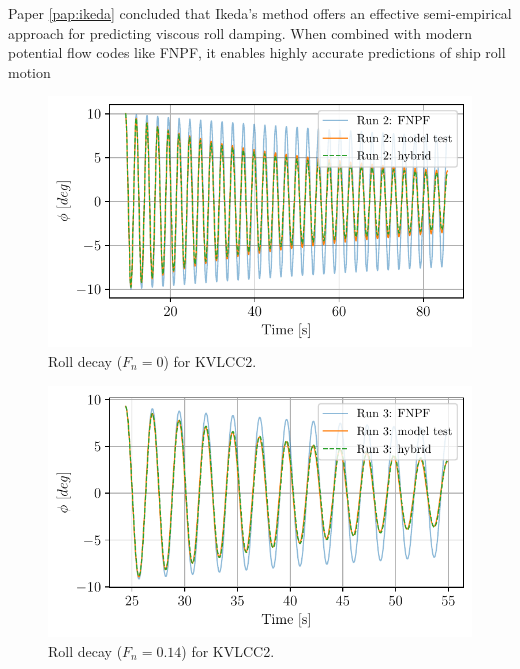 Paper \ref{pap:ikeda} concluded that Ikeda's method offers an effective semi-empirical approach for predicting viscous roll damping. When combined with modern potential flow codes like FNPF, it enables highly accurate predictions of ship roll motion 
\begin{figure}[h]
\center
\includegraphics[width=\textwidth]{figures/hybrid_0_time.pdf}
\caption{Roll decay ($F_n=0$) for KVLCC2.}
\label{fig:hybrid_0_time}
\end{figure}
\begin{figure}[h]
\center
\includegraphics[width=\textwidth]{figures/hybrid_speed_time.pdf}
\caption{Roll decay ($F_n=0.14$) for KVLCC2.}
\label{fig:hybrid_speed_time}
\end{figure}
\clearpage